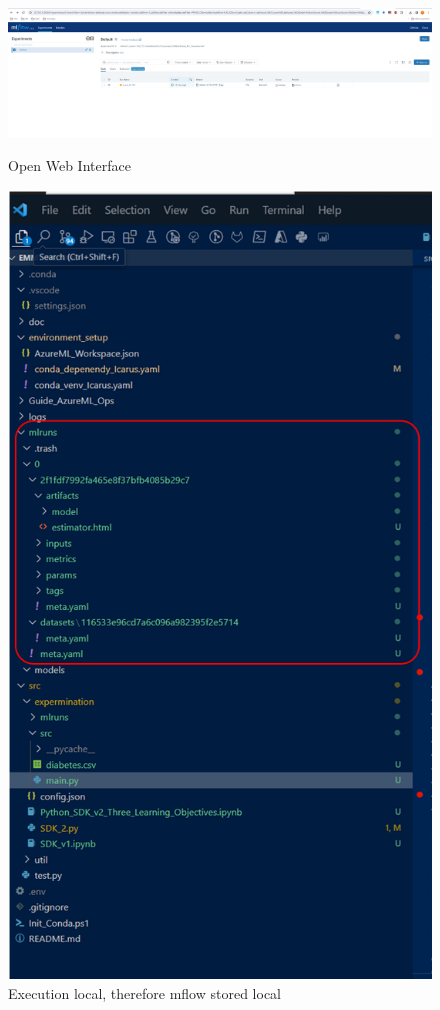 \begin{figure}[H]
	\centering
	\includegraphics[scale = 0.2]{attachment/chapter_AML/Scc029}
	\caption{Open Web Interface}
	\includegraphics[scale = 0.4]{attachment/chapter_AML/Scc031}
	\caption{Execution local, therefore mflow stored local}
\end{figure}

